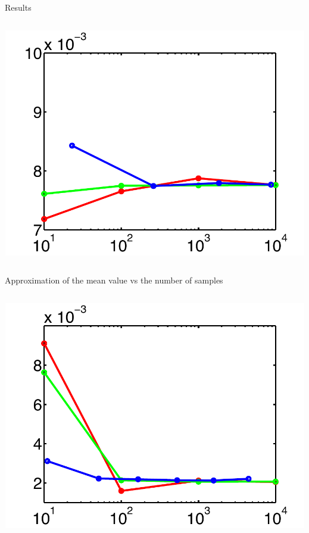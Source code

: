 \documentclass[final]{beamer}
\newcommand{\E}{\ensuremath{\mathbb{E}} } %
\newcommand{\bx}{\ensuremath{\mathbf{x}}} %
\begin{document}
\begin{frame}{}
{\begin{columns}[t]
\begin{column}{.30\linewidth}
\begin{block}{\centering Results}
\begin{columns}[T]
\begin{column}{14cm}{}
\includegraphics[height=10cm, width = 14cm]{figures/exp11errors}\\
\end{column}
\end{columns}
\vspace{0.5em}
\centering\scriptsize{Approximation of the mean value vs the number of samples}
\vspace{-0.5em}
\begin{columns}[T]
\begin{column}{12cm}{}
\includegraphics[height=10cm, width = 14cm]{figures/semidev5errors}\\

\end{column}
\end{columns}
\end{block}
\end{column}
\end{columns}}
\end{frame}
\end{document}
